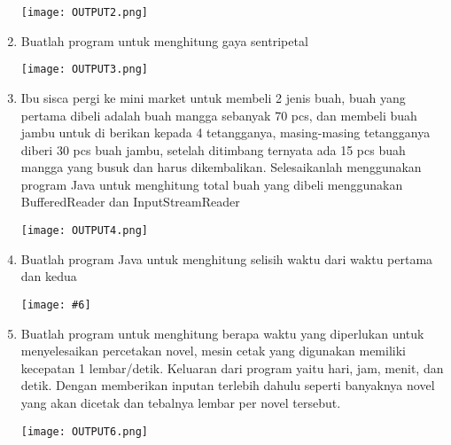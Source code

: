 \documentclass[8pt, a4paper]{article}
\newcommand{\lstinputwithcaption}[2]{%
}
\newcommand{\codeListing}[6] {

  \begin{multicols}{2}
    \lstinputwithcaption{#1}{#2}

    \columnbreak

    \lstinputwithcaption{#3}{#4}

  \end{multicols}

  \begin{center}
    \texttt{[image: \#6]}
  \end{center}

}
\begin{document}
\begin{enumerate}
      \begin{center}
        \texttt{[image: OUTPUT2.png]}
      \end{center}


  \item Buatlah program untuk menghitung gaya sentripetal

    \lstinputwithcaption{./code/src/gaya\_sentripal/Main.java}{Main.java}

      \begin{center}
        \texttt{[image: OUTPUT3.png]}
      \end{center}

  \item Ibu sisca pergi ke mini market untuk membeli 2 jenis buah, buah yang
    pertama dibeli adalah buah mangga sebanyak 70 pcs, dan membeli buah jambu
    untuk di berikan kepada 4 tetangganya, masing-masing tetangganya diberi
    30 pcs buah jambu, setelah ditimbang ternyata ada 15 pcs buah mangga yang
    busuk dan harus dikembalikan. Selesaikanlah menggunakan program Java untuk
    menghitung total buah yang dibeli menggunakan BufferedReader dan
    InputStreamReader

    \lstinputwithcaption{./code/src/total\_buah/Main.java}{Main.java}

    \begin{center}
      \texttt{[image: OUTPUT4.png]}
    \end{center}

  \item Buatlah program Java untuk menghitung selisih waktu dari waktu pertama
    dan kedua 

    \codeListing
      {./code/src/selisih\_waktu/Waktu.java}{Waktu.java}
      {./code/src/selisih\_waktu/Main.java}{Main.java}
      {0.6}{OUTPUT5.png}

  \item Buatlah program untuk menghitung berapa waktu yang diperlukan untuk
    menyelesaikan percetakan novel, mesin cetak yang digunakan memiliki
    kecepatan 1 lembar/detik. Keluaran dari program yaitu hari, jam,
    menit, dan detik. Dengan memberikan inputan terlebih dahulu 
    seperti banyaknya novel yang akan dicetak dan tebalnya lembar
    per novel tersebut.

    \lstinputwithcaption{./code/src/waktu\_cetak/Main.java}{Main.java}

      \begin{center}
        \texttt{[image: OUTPUT6.png]}
      \end{center}

\end{enumerate}
\end{document}
